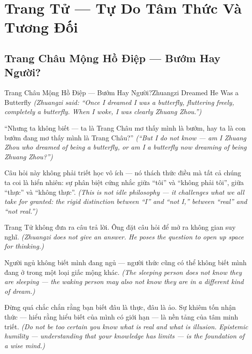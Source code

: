 \chapter{Trang Tử — Tự Do Tâm Thức Và Tương Đối}

\section{Trang Châu Mộng Hồ Điệp — Bướm Hay Người?}
\begin{truyen}{Trang Châu Mộng Hồ Điệp — Bướm Hay Người?}{Zhuangzi Dreamed He Was a Butterfly}
\textit{(Zhuangzi said: ``Once I dreamed I was a butterfly, fluttering freely, completely a butterfly. When I woke, I was clearly Zhuang Zhou.'')}

``Nhưng ta không biết — ta là Trang Châu mơ thấy mình là bướm, hay ta là con bướm đang mơ thấy mình là Trang Châu?''
\textit{(``But I do not know — am I Zhuang Zhou who dreamed of being a butterfly, or am I a butterfly now dreaming of being Zhuang Zhou?'')}

Câu hỏi này không phải triết học vô ích — nó thách thức điều mà tất cả chúng ta coi là hiển nhiên: sự phân biệt cứng nhắc giữa ``tôi'' và ``không phải tôi'', giữa ``thực'' và ``không thực''.
\textit{(This is not idle philosophy — it challenges what we all take for granted: the rigid distinction between ``I'' and ``not I,'' between ``real'' and ``not real.'')}

Trang Tử không đưa ra câu trả lời. Ông đặt câu hỏi để mở ra không gian suy nghĩ.
\textit{(Zhuangzi does not give an answer. He poses the question to open up space for thinking.)}

Người ngủ không biết mình đang ngủ — người thức cũng có thể không biết mình đang ở trong một loại giấc mộng khác.
\textit{(The sleeping person does not know they are sleeping — the waking person may also not know they are in a different kind of dream.)}

\end{truyen}

\begin{baihoc}
Đừng quá chắc chắn rằng bạn biết đâu là thực, đâu là ảo. Sự khiêm tốn nhận thức — hiểu rằng hiểu biết của mình có giới hạn — là nền tảng của tâm minh triết.
\textit{(Do not be too certain you know what is real and what is illusion. Epistemic humility — understanding that your knowledge has limits — is the foundation of a wise mind.)}
\end{baihoc}
\ngancach

